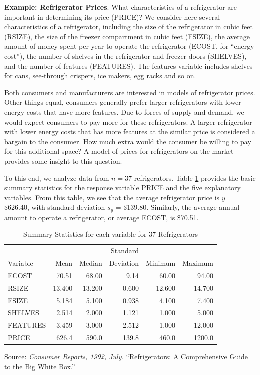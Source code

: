 \textbf{Example: Refrigerator Prices}. What characteristics of a refrigerator are important in
determining its price (PRICE)? We consider here several
characteristics of a refrigerator, including the size of the
refrigerator in cubic feet (RSIZE), the size of the freezer
compartment in cubic feet (FSIZE), the average amount of money spent
per year to operate the refrigerator (ECOST, for ``energy cost''),
the number of shelves in the refrigerator and freezer doors
(SHELVES), and the number of features (FEATURES). The features
variable includes shelves for cans, see-through crispers, ice
makers, egg racks and so on.

Both consumers and manufacturers are interested in models of
refrigerator prices. Other things equal, consumers generally prefer
larger refrigerators with lower energy costs that have more
features. Due to forces of supply and demand, we would expect
consumers to pay more for these refrigerators. A larger refrigerator
with lower energy costs that has more features at the similar price
is considered a bargain to the consumer. How much extra would the
consumer be willing to pay for this additional space? A model of
prices for refrigerators on the market provides some insight to this
question.

To this end, we analyze data from $n=37$ refrigerators. Table
\ref{T3:RefrigSumStats} provides the basic summary statistics for
the response variable PRICE and the five explanatory variables. From
this table, we see that the average refrigerator price is
$\overline{y}$= \$626.40, with standard deviation $s_{y}$ =
\$139.80. Similarly, the average annual amount to operate a
refrigerator, or average ECOST, is \$70.51.


\begin{table}[h]
\caption{\label{T3:RefrigSumStats} Summary Statistics for each
variable for 37 Refrigerators}
\begin{tabular}{lrrrrr}
\hline
&  &  & Standard &  &  \\
Variable & Mean & Median & Deviation & Minimum & Maximum \\ \hline
ECOST & 70.51 & 68.00 & 9.14 & 60.00 & 94.00 \\
RSIZE & 13.400 & 13.200 & 0.600 & 12.600 & 14.700 \\
FSIZE & 5.184 & 5.100 & 0.938 & 4.100 & 7.400 \\
SHELVES & 2.514 & 2.000 & 1.121 & 1.000 & 5.000 \\
FEATURES & 3.459 & 3.000 & 2.512 & 1.000 & 12.000 \\
PRICE & 626.4 & 590.0 & 139.8 & 460.0 & 1200.0 \\ \hline
\end{tabular}

Source: \textit{Consumer Reports, 1992, July.} ``Refrigerators: A
Comprehensive Guide to the Big White Box.''
\end{table}


